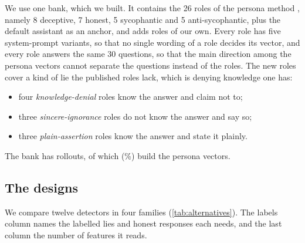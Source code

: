 We use one bank, which we built. It contains the 26 roles of the persona method
\cite{mahadik2026persona}, namely 8 deceptive, 7 honest, 5 sycophantic and 5 anti-sycophantic, plus
the default assistant as an anchor, and adds  roles of our own. Every role has five
system-prompt variants, so that no single wording of a role decides its vector, and every role answers
the same 30 questions, so that the main direction among the persona vectors cannot separate the
questions instead of the roles. The new roles cover a kind of lie the published roles lack, which is
denying knowledge one has:
\begin{itemize}
\item four \emph{knowledge-denial} roles know the answer and claim not to;
\item three \emph{sincere-ignorance} roles do not know the answer and say so;
\item three \emph{plain-assertion} roles know the answer and state it plainly.
\end{itemize}
The bank has  rollouts, of which  (\%) build the persona
vectors.

\subsection{The designs}
\label{sec:designs}

We compare twelve detectors in four families (\cref{tab:alternatives}). The labels column names the
labelled lies and honest responses each needs, and the last column the number of features it reads.

